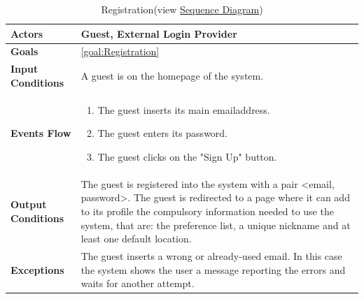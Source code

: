 \begin{table}[H]	
	\centering
	\def\arraystretch{1.5}
	\begin{tabular}{|m{7cm}|m{7cm}|}
		\hline
		\textbf{Actors}            & Guest, External Login Provider		    \\ \hline
		\textbf{Goals}             & \ref{goal:Registration}           \\ \hline
		\textbf{Input Conditions}  & A guest is on the homepage of the system.           \\ \hline
		\textbf{Events Flow}       &   
		\begin{enumerate}
			\item The guest inserts its main emailaddress.
			\item The guest enters its password.
			\item The guest clicks on the "Sign Up" button.
		\end{enumerate}    \\ \hline
		\textbf{Output Conditions} & The guest is registered into the system with a pair <email, password>. The guest is redirected to a page where it can add to its profile the compulsory information needed to use the system, that are: the preference list, a unique nickname and at least one default location.      \\ \hline
		\textbf{Exceptions}        & The guest inserts a wrong or already-used email. In this case the system shows the user a message reporting the errors and waits for another attempt.            \\ \hline
	\end{tabular}
	\caption[Registration]{{Registration}\label{UseCaseDescr:Registration} (view \hyperref[SeqDiagr:Registration]{Sequence Diagram})}
\end{table}

